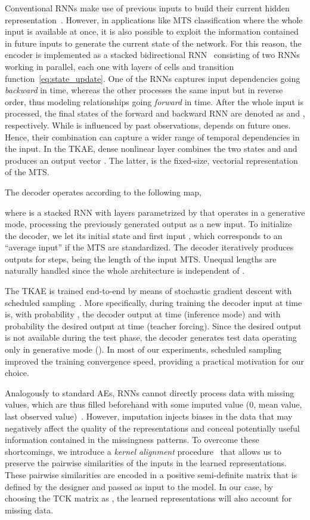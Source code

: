 \documentclass[a4paper,10pt,pdftex]{article}
\begin{document}
Conventional RNNs make use of previous inputs to build their current hidden representation~\cite{6638947}. 
However, in applications like MTS classification where the whole input is available at once, it is also possible to exploit the information contained in future inputs to generate the current state of the network.
For this reason, the encoder is implemented as a stacked bidirectional RNN~\cite{schuster1997bidirectional} consisting of two RNNs working in parallel, each one with  layers of  cells and transition function~\eqref{eq:state_update}. 
One of the RNNs captures input dependencies going \textit{backward} in time, whereas the other processes the same input but in reverse order, thus modeling relationships going \textit{forward} in time.
After the whole input is processed, the final states of the forward and backward RNN are denoted as  and , respectively.
While  is influenced by past observations,  depends on future ones. Hence, their combination can capture a wider range of temporal dependencies in the input.
In the TKAE, dense nonlinear layer  combines the two states  and  and produces an output vector .
The latter, is the fixed-size, vectorial representation of the MTS.

The decoder operates according to the following map,

where  is a stacked RNN with  layers parametrized by  that operates in a generative mode, processing the previously generated output as a new input.
To initialize the decoder, we let its initial state  and first input , which corresponds to an ``average input'' if the MTS are standardized.
The decoder iteratively produces outputs for  steps,  being the length of the input MTS.
Unequal lengths are naturally handled since the whole architecture is independent of .

The TKAE is trained end-to-end by means of stochastic gradient descent with scheduled sampling~\cite{NIPS2015_5956}.
More specifically, during training the decoder input at time  is, with probability , the decoder output at time  (inference mode) and with probability  the desired output at time  (teacher forcing). 
Since the desired output is not available during the test phase, the decoder generates test data operating only in generative mode ().
In most of our experiments, scheduled sampling improved the training convergence speed, providing a practical motivation for our choice.

Analogously to standard AEs, RNNs cannot directly process data with missing values, which are thus filled beforehand with some imputed value (0, mean value, last observed value)~\cite{schafer2002missing}.
However, imputation injects biases in the data that may negatively affect the quality of the representations and conceal potentially useful information contained in the missingness patterns.
To overcome these shortcomings, we introduce a \textit{kernel alignment} procedure~\cite{kernelAE} that allows us to preserve the pairwise similarities of the inputs in the learned representations. 
These pairwise similarities are encoded in a positive semi-definite matrix  that is defined by the designer and passed as input to the model.
In our case, by choosing the TCK matrix as , the learned representations will also account for missing data.
\end{document}
